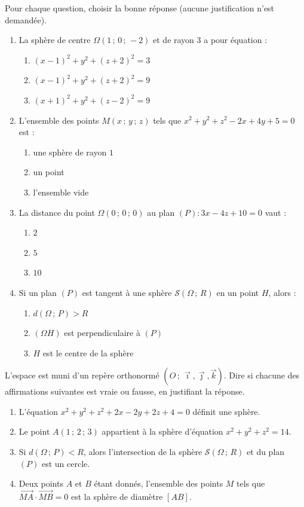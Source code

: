 \documentclass[11pt]{article}
\begin{document}
\begin{exercice}
Pour chaque question, choisir la bonne réponse (aucune justification n'est demandée).
\begin{enumerate}
\item La sphère de centre $\Omega(1\,;\,0\,;\,-2)$ et de rayon $3$ a pour équation :
\begin{enumerate}
\item[(a)] $(x-1)^2+y^2+(z+2)^2=3$
\item[(b)] $(x-1)^2+y^2+(z+2)^2=9$
\item[(c)] $(x+1)^2+y^2+(z-2)^2=9$
\end{enumerate}
\item L'ensemble des points $M(x\,;\,y\,;\,z)$ tels que $x^2+y^2+z^2-2x+4y+5=0$ est :
\begin{enumerate}
\item[(a)] une sphère de rayon $1$
\item[(b)] un point
\item[(c)] l'ensemble vide
\end{enumerate}
\item La distance du point $\Omega(0\,;\,0\,;\,0)$ au plan $(P) : 3x-4z+10=0$ vaut :
\begin{enumerate}
\item[(a)] $2$
\item[(b)] $5$
\item[(c)] $10$
\end{enumerate}
\item Si un plan $(P)$ est tangent à une sphère $\mathcal{S}(\Omega\,;\,R)$ en un point $H$, alors :
\begin{enumerate}
\item[(a)] $d(\Omega\,;\,P) > R$
\item[(b)] $(\Omega H)$ est perpendiculaire à $(P)$
\item[(c)] $H$ est le centre de la sphère
\end{enumerate}
\end{enumerate}
\end{exercice}

\begin{exercice}
L'espace est muni d'un repère orthonormé $(O\,;\,\vec{\imath},\vec{\jmath},\vec{k})$. Dire si chacune des affirmations suivantes est vraie ou fausse, en justifiant la réponse.
\begin{enumerate}
\item L'équation $x^2+y^2+z^2+2x-2y+2z+4=0$ définit une sphère.
\item Le point $A(1\,;\,2\,;\,3)$ appartient à la sphère d'équation $x^2+y^2+z^2=14$.
\item Si $d(\Omega\,;\,P) < R$, alors l'intersection de la sphère $\mathcal{S}(\Omega\,;\,R)$ et du plan $(P)$ est un cercle.
\item Deux points $A$ et $B$ étant donnés, l'ensemble des points $M$ tels que $\overrightarrow{MA}\cdot\overrightarrow{MB}=0$ est la sphère de diamètre $[AB]$.
\end{enumerate}
\end{exercice}
\end{document}
